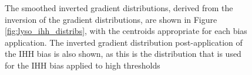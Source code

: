 \begin{figure}[ht!]
	\centering
	\caption{The smoothed inverted gradient distributions, derived from the inversion of the gradient distributions, are shown in Figure \ref{fig:lyso_ihh_distribs}, with the centroids appropriate for each bias application. The inverted gradient distribution post-application of the IHH bias is also shown, as this is the distribution that is used for the IHH bias applied to high thresholds}
	\label{fig:auto_aht_distribs}
\end{figure}

